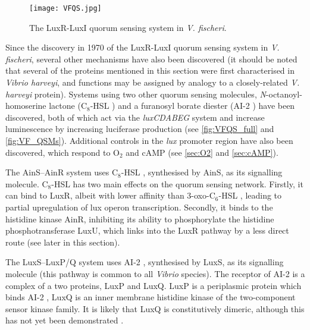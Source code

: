 \begin{figure}[H]
	\begin{center}
		\texttt{[image: VFQS.jpg]}
		\caption{The LuxR-LuxI quorum sensing system in \textit{V. fischeri}. \label{fig:VF_QS}}
	\end{center}
\end{figure}


Since the discovery in 1970 of the LuxR-LuxI quorum sensing system in \textit{V. fischeri}, several other mechanisms have also been discovered (it should be noted that several of the proteins mentioned in this section were first characterised in \textit{Vibrio harveyi}, and functions may be assigned by analogy to a closely-related \textit{V. harveyi} protein\cite{Miyashiro2012}). Systems using two other quorum sensing molecules, \textit{N}-octanoyl-homoserine lactone (C$_8$-HSL ) and a furanosyl borate diester (AI-2 ) have been discovered, both of which act via the \textit{luxCDABEG} system and increase luminescence by increasing luciferase production\cite{Miyashiro2012,Verma2013} (see \ref{fig:VFQS_full} and \ref{fig:VF_QSMs}).
Additional controls in the \textit{lux} promoter region have also been discovered, which respond to O$_2$ and cAMP\cite{Miyashiro2012} (see \ref{sec:O2} and \ref{sec:cAMP}). 

The AinS–AinR system uses C$_8$-HSL , synthesised by AinS, as its signalling molecule\cite{Lupp2003, Miyashiro2012,Gilson1995}. C$_8$-HSL  has two main effects on the quorum sensing network. Firstly, it can bind to LuxR\cite{Schaefer1996}, albeit with lower affinity than 3-oxo-C$_6$-HSL , leading to partial upregulation of lux operon transcription.
Secondly, it binds to the histidine kinase AinR, inhibiting its ability to phosphorylate the histidine phosphotransferase LuxU, which links into the LuxR pathway by a less direct route (see later in this section)\cite{Timmen2006}.  


The LuxS–LuxP/Q system uses AI-2 , synthesised by LuxS, as its signalling molecule\cite{Miyashiro2012,Neiditch2005,Neiditch2006} (this pathway is common to all \textit{Vibrio} species\cite{Miyashiro2012}). The receptor of AI-2  is a complex of a two proteins, LuxP and LuxQ. LuxP is a periplasmic protein which binds AI-2 , LuxQ is an inner membrane histidine kinase of the two-component sensor kinase family\cite{Bassler1994}. It is likely that LuxQ is constitutively dimeric, although this has not yet been demonstrated \cite{Stock2000}. 

